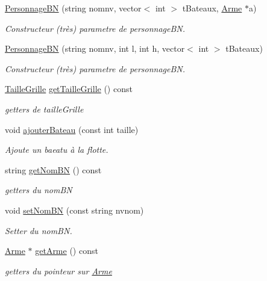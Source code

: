 \begin{DoxyCompactItemize}
\hyperlink{classPersonnageBN_a49265459e63c0bea4f9dfb702dd76c40}{Personnage\-B\-N} (string nomnv, vector$<$ int $>$ t\-Bateaux, \hyperlink{classArme}{Arme} $\ast$a)
\begin{DoxyCompactList}\small\item\em Constructeur (très) parametre de personnage\-B\-N. \end{DoxyCompactList}\item 
\hyperlink{classPersonnageBN_ad0c724004d5896a6ca9bd3501c432039}{Personnage\-B\-N} (string nomnv, int l, int h, vector$<$ int $>$ t\-Bateaux)
\begin{DoxyCompactList}\small\item\em Constructeur (très) parametre de personnage\-B\-N. \end{DoxyCompactList}\item 
\hyperlink{classTailleGrille}{Taille\-Grille} \hyperlink{classPersonnageBN_a79d3d1e8c0b174ac9659edb26787380d}{get\-Taille\-Grille} () const 
\begin{DoxyCompactList}\small\item\em getters de taille\-Grille \end{DoxyCompactList}\item 
void \hyperlink{classPersonnageBN_a00256daec53f83cd70540647cdff2fa8}{ajouter\-Bateau} (const int taille)
\begin{DoxyCompactList}\small\item\em Ajoute un baeatu à la flotte. \end{DoxyCompactList}\item 
string \hyperlink{classPersonnageBN_af8957d888f3065180f12919ff6a04948}{get\-Nom\-B\-N} () const 
\begin{DoxyCompactList}\small\item\em getters du nom\-B\-N \end{DoxyCompactList}\item 
void \hyperlink{classPersonnageBN_a5b63a8a11fbb52a26c8aa29407dc2071}{set\-Nom\-B\-N} (const string nvnom)
\begin{DoxyCompactList}\small\item\em Setter du nom\-B\-N. \end{DoxyCompactList}\item 
\hyperlink{classArme}{Arme} $\ast$ \hyperlink{classPersonnageBN_a6ff27cfd1a82e6127accfcfebd09be08}{get\-Arme} () const 
\begin{DoxyCompactList}\small\item\em getters du pointeur sur \hyperlink{classArme}{Arme} \end{DoxyCompactList}\item 

\end{DoxyCompactItemize}
